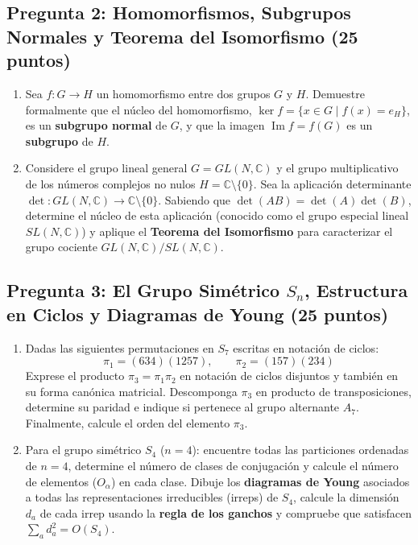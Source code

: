 \documentclass[11pt, a4paper]{article}
\begin{document}
\subsection*{\textcolor{primary}{Pregunta 2: Homomorfismos, Subgrupos Normales y Teorema del Isomorfismo (25 puntos)}}
\begin{enumerate}[label=\textbf{\alph*)}]
    \item Sea $f: G \to H$ un homomorfismo entre dos grupos $G$ y $H$. Demuestre formalmente que el núcleo del homomorfismo, $\ker f = \{x \in G \mid f(x) = e_H\}$, es un \textbf{subgrupo normal} de $G$, y que la imagen $\operatorname{Im} f = f(G)$ es un \textbf{subgrupo} de $H$.
    \item Considere el grupo lineal general $G = GL(N, \mathbb{C})$ y el grupo multiplicativo de los números complejos no nulos $H = \mathbb{C} \setminus \{0\}$. Sea la aplicación determinante $\det : GL(N, \mathbb{C}) \to \mathbb{C} \setminus \{0\}$. Sabiendo que $\det(AB) = \det(A)\det(B)$, determine el núcleo de esta aplicación (conocido como el grupo especial lineal $SL(N, \mathbb{C})$) y aplique el \textbf{Teorema del Isomorfismo} para caracterizar el grupo cociente $GL(N, \mathbb{C}) / SL(N, \mathbb{C})$.
\end{enumerate}

\subsection*{\textcolor{primary}{Pregunta 3: El Grupo Simétrico $S_n$, Estructura en Ciclos y Diagramas de Young (25 puntos)}}
\begin{enumerate}[label=\textbf{\alph*)}]
    \item Dadas las siguientes permutaciones en $S_7$ escritas en notación de ciclos:
    \[
    \pi_1 = (634)(1257), \qquad \pi_2 = (157)(234)
    \]
    Exprese el producto $\pi_3 = \pi_1 \pi_2$ en notación de ciclos disjuntos y también en su forma canónica matricial. Descomponga $\pi_3$ en producto de transposiciones, determine su paridad e indique si pertenece al grupo alternante $A_7$. Finalmente, calcule el orden del elemento $\pi_3$.
    \item Para el grupo simétrico $S_4$ ($n=4$): encuentre todas las particiones ordenadas de $n=4$, determine el número de clases de conjugación y calcule el número de elementos ($O_\alpha$) en cada clase. Dibuje los \textbf{diagramas de Young} asociados a todas las representaciones irreducibles (irreps) de $S_4$, calcule la dimensión $d_a$ de cada irrep usando la \textbf{regla de los ganchos} y compruebe que satisfacen $\sum_a d_a^2 = O(S_4)$.
\end{enumerate}
\end{document}

